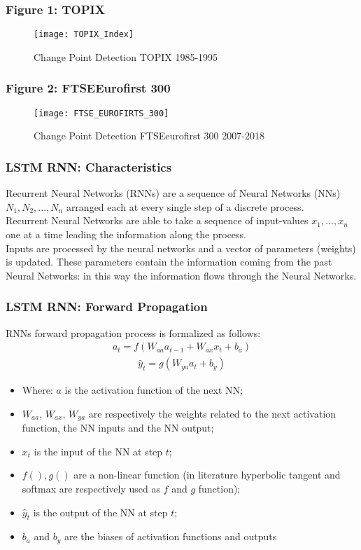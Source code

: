 \documentclass[aspectratio=1610]{beamer}
\begin{document}
\begin{frame}
	\frametitle{Figure 1: TOPIX}
	\begin{figure}[!h]
		\centering
		{\texttt{[image: TOPIX\_Index]}}
		\caption{Change Point Detection TOPIX 1985-1995 \label{t1v2}}
	\end{figure}
\end{frame}
\begin{frame}
	\frametitle{Figure 2: FTSEEurofirst 300}
	\begin{figure}[!h]
		\centering
		{\texttt{[image: FTSE\_EUROFIRTS\_300]}}
		\caption{Change Point Detection FTSEeurofirst 300 2007-2018 \label{t1v2}}
	\end{figure}
 	\end{frame}
 	\begin{frame}
 		\frametitle{LSTM RNN: Characteristics}
 		Recurrent Neural Networks (RNNs) are a sequence of Neural Networks (NNs) $N_1,N_2, ..., N_n$ arranged each at every single step of a discrete process.\\
 		Recurrent Neural Networks are able to take a sequence of input-values $x_1, ..., x_n$ one at a time leading the information along the process.\\ 
 		Inputs are processed by the neural networks and a vector of parameters (weights) is updated. These parameters contain the information coming from the past Neural Networks: in this way the information flows through the Neural Networks.
 	\end{frame}
\begin{frame}
\frametitle{LSTM RNN: Forward Propagation}
RNNs forward propagation process is formalized as follows:
\begin{eqnarray}
a_{t} = f(W_{aa} a_{t-1}+W_{ax}x_{t}+b_a)
\end{eqnarray}
\begin{eqnarray}
\hat{y}_{t} = g(W_{ya}a_{t}+b_y)
\end{eqnarray}
\begin{itemize}
\item Where: $a$ is the activation function of the next NN; 
\item $W_{aa}$, $W_{ax}$, $W_{ya}$ are respectively the weights related to the next activation function, the NN inputs and the NN output;
\item $x_{t}$ is the input of the NN at step $t$;
\item $f(),g()$ are a non-linear function (in literature hyperbolic tangent and softmax are respectively used as $f$ and $g$ function);
\item $\hat{y}_{t}$ is the output of the NN at step $t$;
\item $b_a$ and $b_y$ are the biases of activation functions and outputs 
\end{itemize}	
\end{frame}
\end{document}
